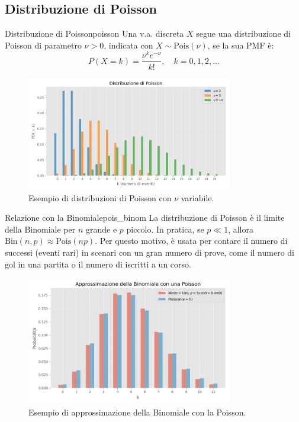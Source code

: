 \subsection{Distribuzione di Poisson}

\begin{definizione}{Distribuzione di Poisson}{poisson}
Una v.a. discreta \(X\) segue una distribuzione di Poisson di parametro \(\nu > 0\), indicata con \(X \sim \text{Pois}(\nu)\), se la sua PMF è:
\[
P(X=k) = \frac{\nu^k e^{-\nu}}{k!}, \quad k=0, 1, 2, \dots \text{}
\]
\end{definizione}

\begin{figure}[H]
    \centering
    \includegraphics[width=0.8\textwidth]{images/poisson.png}
    \caption{Esempio di distribuzioni di Poisson con \(\nu\) variabile.}
    \label{fig:poisson}
\end{figure}

\begin{nota}{Relazione con la Binomiale}{pois_binom}
La distribuzione di Poisson è il limite della Binomiale per \(n\) grande e \(p\) piccolo. In pratica, se \(p \ll 1\), allora \(\text{Bin}(n,p) \approx \text{Pois}(np)\). Per questo motivo, è usata per contare il numero di successi (eventi rari) in scenari con un gran numero di prove, come il numero di gol in una partita o il numero di iscritti a un corso.

\begin{figure}[H]
    \centering
    \includegraphics[width=0.8\textwidth]{images/binomiale_vs_poisson.png}
    \caption{Esempio di approssimazione della Binomiale con la Poisson.}
    \label{fig:binomiale_vs_poisson}
\end{figure}

\end{nota}

